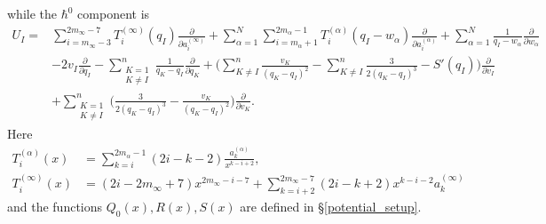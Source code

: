 \documentclass[a4paper,12pt,reqno]{amsart}
\numberwithin{equation}{section}
\numberwithin{counter2}{section}
\begin{document}
while the $\hbar^{0}$ component is 
\begin{align}
U_I = &\sum_{i = m_\infty - 3}^{2m_\infty-7}T_i^{(\infty)}(q_I)\frac{\partial}{\partial a_i^{(\infty)}} + \sum_{\alpha = 1}^{N} \sum_{i = m_\alpha+1}^{2m_\alpha - 1}T_i^{(\alpha)}(q_I-w_\alpha)\frac{\partial}{\partial {a_i^{(\alpha)}}} + \sum_{\alpha = 1}^{N} \frac{1}{q_I-w_\alpha}\frac{\partial}{\partial w_\alpha} \nonumber \\ 
&- 2v_I\frac{\partial}{\partial q_I} - \sum_{\substack{K = 1 \\  K \ne I}}^{n} \frac{1}{q_K-q_I}\frac{\partial}{\partial q_K} + \Bigg(\sum_{K \ne I}^{n} \frac{v_K}{(q_K-q_I)^2} - \sum_{K \ne I}^{n} \frac{3}{2(q_K-q_I)^{3}}  - S'(q_I)\Bigg)\frac{\partial}{\partial v_I} \nonumber \\
&+ \sum_{\substack{K = 1 \\ K \ne I}}^{n} \Bigg(\frac{3}{2(q_K-q_I)^{3}}- \frac{v_K}{(q_K-q_I)^{2}}  \Bigg)\frac{\partial}{\partial v_K}.  
\end{align}
Here 
\begin{align} 
T_i^{(\alpha)}(x) &= \sum_{k=i}^{2m_\alpha-1}(2i-k-2)\frac{a_k^{(\alpha)}}{x^{k-i+2}},  \\ 
 T_{i}^{(\infty)}(x) &= (2i-2m_\infty + 7)x^{2m_\infty-i-7} + \sum_{k=i+2}^{2m_\infty - 7}(2i-k+2)x^{k-i-2}a_k^{(\infty)}
 \end{align}
 and the functions $Q_0(x), R(x),S(x)$ are defined in \S \ref{potential_setup}.  
 
\end{document}
